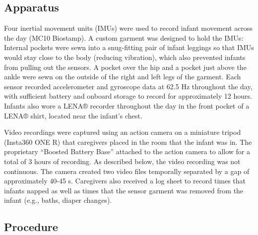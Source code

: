 \documentclass[
  man]{apa6}
\begin{document}
\hypertarget{apparatus}{%
\subsection{Apparatus}\label{apparatus}}

Four inertial movement units (IMUs) were used to record infant movement across the day (MC10 Biostamp). A custom garment was designed to hold the IMUs: Internal pockets were sewn into a snug-fitting pair of infant leggings so that IMUs would stay close to the body (reducing vibration), which also prevented infants from pulling out the sensors. A pocket over the hip and a pocket just above the ankle were sewn on the outside of the right and left legs of the garment. Each sensor recorded accelerometer and gyroscope data at 62.5 Hz throughout the day, with sufficient battery and onboard storage to record for approximately 12 hours. Infants also wore a LENA® recorder throughout the day in the front pocket of a LENA® shirt, located near the infant's chest.

Video recordings were captured using an action camera on a miniature tripod (Insta360 ONE R) that caregivers placed in the room that the infant was in. The proprietary ``Boosted Battery Base'' attached to the action camera to allow for a total of 3 hours of recording. As described below, the video recording was not continuous. The camera created two video files temporally separated by a gap of approximately 40-45 s. Caregivers also received a log sheet to record times that infants napped as well as times that the sensor garment was removed from the infant (e.g., baths, diaper changes).

\hypertarget{procedure}{%
\subsection{Procedure}\label{procedure}}
\end{document}
